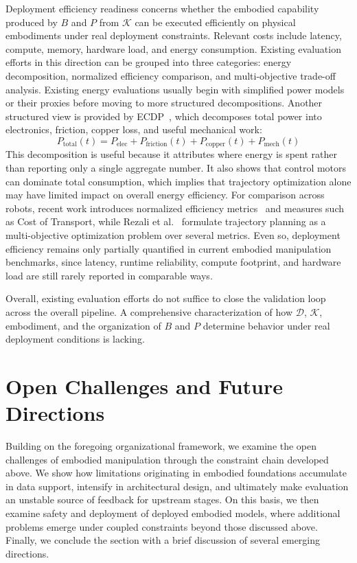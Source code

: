 \documentclass[acmsmall,screen,review]{acmart}
\begin{document}
Deployment efficiency readiness concerns whether the embodied capability produced by \(B\) and \(P\) from \(\mathcal{K}\) can be executed efficiently on physical embodiments under real deployment constraints. Relevant costs include latency, compute, memory, hardware load, and energy consumption. Existing evaluation efforts in this direction can be grouped into three categories: energy decomposition, normalized efficiency comparison, and multi-objective trade-off analysis.
Existing energy evaluations usually begin with simplified power models or their proxies before moving to more structured decompositions.
Another structured view is provided by ECDP~\cite{heredia2023ecdp}, which decomposes total power into electronics, friction, copper loss, and useful mechanical work:
\begin{equation}
P_{\text{total}}(t) = P_{\text{elec}} + P_{\text{friction}}(t) + P_{\text{copper}}(t) + P_{\text{mech}}(t)
\end{equation}
This decomposition is useful because it attributes where energy is spent rather than reporting only a single aggregate number. It also shows that control motors can dominate total consumption, which implies that trajectory optimization alone may have limited impact on overall energy efficiency.
For comparison across robots, recent work introduces normalized efficiency metrics~\cite{vidussi2021energy,heredia2025evaluating} and measures such as Cost of Transport, 
while Rezali et al.~\cite{rezali2025lstm} formulate trajectory planning as a multi-objective optimization problem over several metrics. 
Even so, deployment efficiency remains only partially quantified in current embodied manipulation benchmarks, since latency, runtime reliability, compute footprint, and hardware load are still rarely reported in comparable ways.

Overall, existing evaluation efforts do not suffice to close the validation loop across the overall pipeline.
A comprehensive characterization of how $\mathcal{D}$, $\mathcal{K}$, embodiment, and the organization of \(B\) and \(P\) determine behavior under real deployment conditions is lacking.

\section{Open Challenges and Future Directions}\label{sec:challenges}

Building on the foregoing organizational framework, we examine the open challenges of embodied manipulation through the constraint chain developed above.
We show how limitations originating in embodied foundations accumulate in data support, intensify in architectural design, and ultimately make evaluation an unstable source of feedback for upstream stages.
On this basis, we then examine safety and deployment of deployed embodied models, where additional problems emerge under coupled constraints beyond those discussed above.
Finally, we conclude the section with a brief discussion of several emerging directions.
\end{document}

